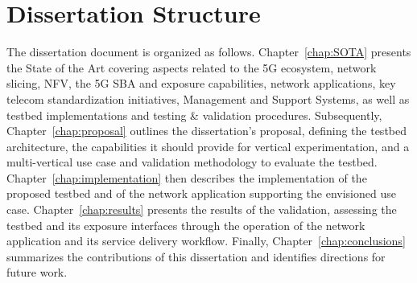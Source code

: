 \section{Dissertation Structure}
\label{chap:introduction:structure}

The dissertation document is organized as follows. Chapter~\ref{chap:SOTA} presents the State of the Art covering aspects related to the \acs{5G} ecosystem, network slicing, \acs{NFV}, the \acs{5G} \acs{SBA} and exposure capabilities, network applications,  key telecom standardization initiatives, Management and Support Systems, as well as testbed implementations and testing \& validation procedures. Subsequently, Chapter~\ref{chap:proposal} outlines the dissertation's proposal, defining the testbed architecture, the capabilities it should provide for vertical experimentation, and a multi-vertical use case and validation methodology to evaluate the testbed. Chapter~\ref{chap:implementation} then describes the implementation of the proposed testbed and of the network application supporting the envisioned use case. Chapter~\ref{chap:results} presents the results of the validation, assessing the testbed and its exposure interfaces through the operation of the network application and its service delivery workflow. Finally, Chapter~\ref{chap:conclusions} summarizes the contributions of this dissertation and identifies directions for future work.
